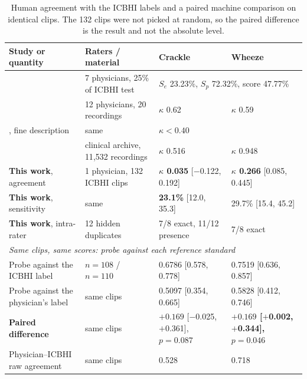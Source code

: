 \documentclass[journal,onecolumn]{IEEEtran}
\newcommand{\best}[1]{\textbf{#1}}
\begin{document}
\begin{table}[hbtp]
\centering
\caption{Human agreement with the ICBHI labels and a paired machine comparison on identical clips. The
132 clips were not picked at random, so the paired difference is the result and not the absolute
level.}
\label{tab:human}
\footnotesize
\setlength{\tabcolsep}{4pt}
\begin{tabular}{llll}
\toprule
Study or quantity & Raters / material & Crackle & Wheeze \\
\midrule
\cite{tzeng2025jmir} & 7 physicians, 25\% of ICBHI test & \multicolumn{2}{l}{$S_e$ 23.23\%, $S_p$ 72.32\%, score 47.77\%} \\
\cite{melbye2016kappa} & 12 physicians, 20 recordings & $\kappa$ 0.62 & $\kappa$ 0.59 \\
, fine description & same & \multicolumn{2}{l}{$\kappa < 0.40$} \\
\cite{huang2024crackles} & clinical archive, 11{,}532 recordings & $\kappa$ 0.516 & $\kappa$ 0.948 \\
\addlinespace
\best{This work}, agreement & 1 physician, 132 ICBHI clips & \best{$\kappa$ 0.035} [$-$0.122, 0.192] & \best{$\kappa$ 0.266} [0.085, 0.445] \\
\best{This work}, sensitivity & same & \best{23.1\%} [12.0, 35.3] & 29.7\% [15.4, 45.2] \\
\best{This work}, intra-rater & 12 hidden duplicates & 7/8 exact, 11/12 presence & 7/8 exact \\
\midrule
\multicolumn{4}{l}{\emph{Same clips, same scores: probe against each reference standard}}\\
Probe against the ICBHI label & $n = 108$ / $n = 110$ & 0.6786 [0.578, 0.778] & 0.7519 [0.636, 0.857] \\
Probe against the physician's label & same clips & 0.5097 [0.354, 0.665] & 0.5828 [0.412, 0.746] \\
\best{Paired difference} & same clips & $+0.169$ [$-$0.025, $+$0.361], $p = 0.087$ & \best{$+0.169$ [$+$0.002, $+$0.344], $p = 0.046$} \\
Physician--ICBHI raw agreement & same clips & 0.528 & 0.718 \\
\bottomrule
\end{tabular}

\vspace{2pt}
\footnotesize
\end{table}
\end{document}
